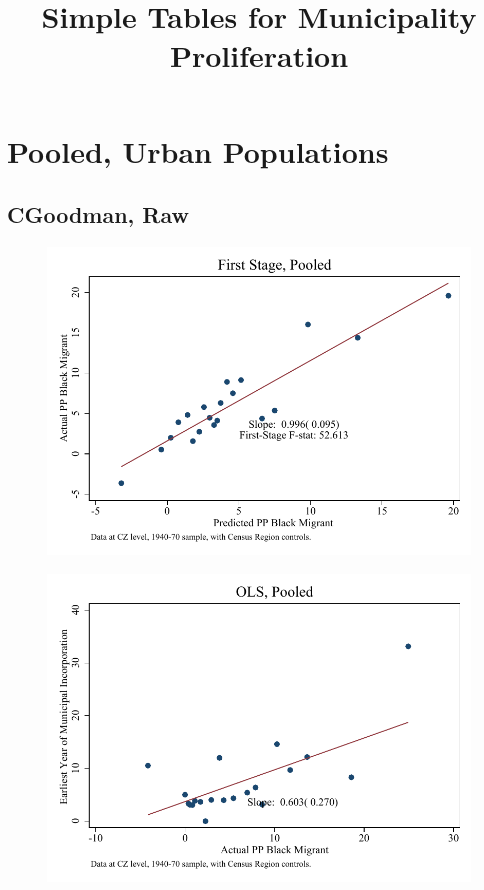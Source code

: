 \documentclass{article}
\title{Simple Tables for Municipality Proliferation}
\begin{document}
\maketitle
\tableofcontents
{\footnotesize 
\listoffigures
\listoftables}
\clearpage

\section{Pooled, Urban Populations}

\subsection{CGoodman, Raw}

\clearpage
\begin{figure}
\centering
\includegraphics{figures/simplefigs/pooled_cgoodman_raw_C3_fs.pdf}
\end{figure}
\clearpage
\begin{figure}
\centering
\includegraphics{figures/simplefigs/pooled_cgoodman_raw_C3_ols.pdf}
\end{figure}
\end{document}
